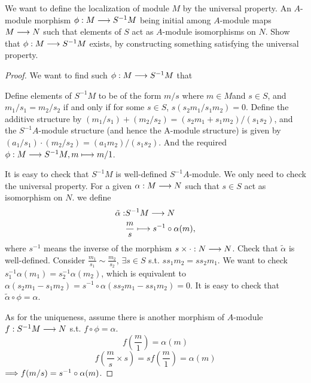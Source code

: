\begin{exr}
We want to define the localization of module $M$ by the universal property. An $A$-module morphism  $\phi: M\longrightarrow S^{-1}M$ being initial among $A$-module maps $M\longrightarrow N$ such that elements of  $S$ act as $A$-module isomorphisms on $N$.
Show that $\phi:M\longrightarrow S^{-1}M$ exists, by constructing something satisfying the universal property. 
\end{exr}
\begin{proof}
We want to find such $\phi:M\longrightarrow S^{-1}M$ that
\begin{center}
\end{center}
Define elements of $S^{-1}M$ to be of the form $m/s$ where $m\in M$and $s\in S$, and $m_1/s_1 =m_2/s_2$ if and only if for some $s\in S$, $s(s_2m_1/ s_1m_2) = 0$. Define the additive structure by $(m_1/s_1) + (m_2/s_2) = (s_2m_1 + s_1m_2)/(s_1s_2)$, and the $S^{-1}A$-module structure (and hence the A-module structure) is given by$ (a_1/s_1)\cdot (m_2/s_2) = (a_1m_2)/(s_1s_2)$. And the required $\phi:M\longrightarrow S^{-1}M ,m\longmapsto m/1$.

It is easy to check that $S^{-1}M$ is well-defined $S^{-1}A$-module. We only need to check the universal property. For a given $\alpha:M\longrightarrow N$ such that $s\in S$ act as isomorphism on $N$. we define
$$
\begin{aligned}
\tilde{\alpha}:& S^{-1}M\longrightarrow N\\
& \frac{m}{s}\longmapsto s^{-1}\circ\alpha(m),
\end{aligned}
$$
where $s^{-1}$ means the inverse of the morphism $s\times \cdot: N\longrightarrow N$. Check that $\tilde{\alpha}$ is well-defined. Consider $\frac{m_1}{s_1}\sim \frac{m_2}{s_2}$, $\exists s\in S$ s.t. $s s_1m_2=s s_2m_1$. We want to check $s_1^{-1}\alpha(m_1)=s_2^{-1}\alpha(m_2)$, which is equivalent to $\alpha(s_2 m_1-s_1m_2)=s^{-1}\circ \alpha(s s_2m_1-s s_1m_2)=0$.
It is easy to check that $\tilde{\alpha}\circ \phi=\alpha$.

As for the uniqueness, assume there is another morphism of $A$-module $f:S^{-1}M\longrightarrow N$ s.t. $f\circ \phi=\alpha$.
$$
f\left(\frac{m}{1}\right)=\alpha(m)
$$
$$
f\left(\frac{m}{s}\times s\right)=s f\left(\frac{m}{1}\right)=\alpha(m)
$$
$\Longrightarrow f(m/s)=s^{-1}\circ \alpha(m)$.
\end{proof}
